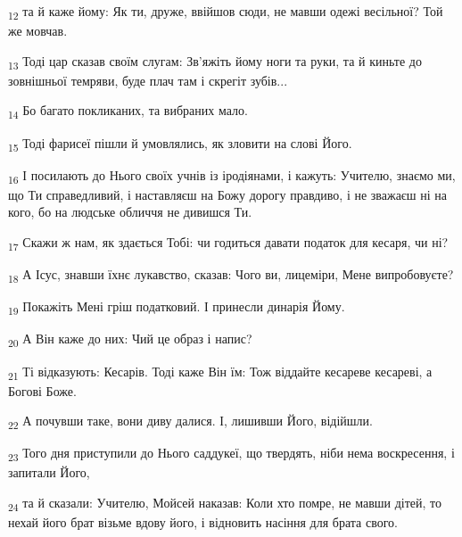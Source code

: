 \begin{tcolorbox}
\textsubscript{12} та й каже йому: Як ти, друже, ввійшов сюди, не мавши одежі весільної? Той же мовчав.
\end{tcolorbox}
\begin{tcolorbox}
\textsubscript{13} Тоді цар сказав своїм слугам: Зв'яжіть йому ноги та руки, та й киньте до зовнішньої темряви, буде плач там і скрегіт зубів...
\end{tcolorbox}
\begin{tcolorbox}
\textsubscript{14} Бо багато покликаних, та вибраних мало.
\end{tcolorbox}
\begin{tcolorbox}
\textsubscript{15} Тоді фарисеї пішли й умовлялись, як зловити на слові Його.
\end{tcolorbox}
\begin{tcolorbox}
\textsubscript{16} І посилають до Нього своїх учнів із іродіянами, і кажуть: Учителю, знаємо ми, що Ти справедливий, і наставляєш на Божу дорогу правдиво, і не зважаєш ні на кого, бо на людське обличчя не дивишся Ти.
\end{tcolorbox}
\begin{tcolorbox}
\textsubscript{17} Скажи ж нам, як здається Тобі: чи годиться давати податок для кесаря, чи ні?
\end{tcolorbox}
\begin{tcolorbox}
\textsubscript{18} А Ісус, знавши їхнє лукавство, сказав: Чого ви, лицеміри, Мене випробовуєте?
\end{tcolorbox}
\begin{tcolorbox}
\textsubscript{19} Покажіть Мені гріш податковий. І принесли динарія Йому.
\end{tcolorbox}
\begin{tcolorbox}
\textsubscript{20} А Він каже до них: Чий це образ і напис?
\end{tcolorbox}
\begin{tcolorbox}
\textsubscript{21} Ті відказують: Кесарів. Тоді каже Він їм: Тож віддайте кесареве кесареві, а Богові Боже.
\end{tcolorbox}
\begin{tcolorbox}
\textsubscript{22} А почувши таке, вони диву далися. І, лишивши Його, відійшли.
\end{tcolorbox}
\begin{tcolorbox}
\textsubscript{23} Того дня приступили до Нього саддукеї, що твердять, ніби нема воскресення, і запитали Його,
\end{tcolorbox}
\begin{tcolorbox}
\textsubscript{24} та й сказали: Учителю, Мойсей наказав: Коли хто помре, не мавши дітей, то нехай його брат візьме вдову його, і відновить насіння для брата свого.
\end{tcolorbox}
